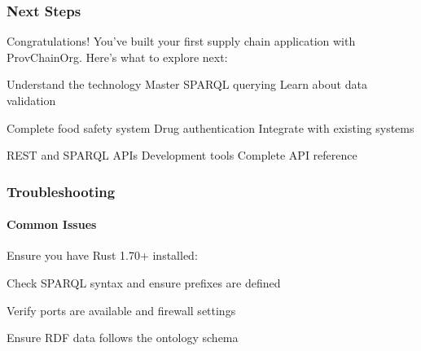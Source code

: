 \documentclass[letterpaper,10pt,english]{sphinxmanual}
\begin{document}
\subsubsection{Next Steps}
\label{\detokenize{tutorials/first-supply-chain:next-steps}}
\sphinxAtStartPar
Congratulations! You’ve built your first supply chain application with ProvChainOrg. Here’s what to explore next:

\sphinxAtStartPar
{}
\sphinxhyphen{} {\hyperref[\detokenize{foundational/intro-to-rdf-blockchain::doc}]{}} \sphinxhyphen{} Understand the technology
\sphinxhyphen{}  \sphinxhyphen{} Master SPARQL querying
\sphinxhyphen{}  \sphinxhyphen{} Learn about data validation

\sphinxAtStartPar
{}
\sphinxhyphen{}  \sphinxhyphen{} Complete food safety system
\sphinxhyphen{}  \sphinxhyphen{} Drug authentication
\sphinxhyphen{}  \sphinxhyphen{} Integrate with existing systems

\sphinxAtStartPar
{}
\sphinxhyphen{}  \sphinxhyphen{} REST and SPARQL APIs
\sphinxhyphen{}  \sphinxhyphen{} Development tools
\sphinxhyphen{} {\hyperref[\detokenize{api/rest-api::doc}]{}} \sphinxhyphen{} Complete API reference


\subsubsection{Troubleshooting}
\label{\detokenize{tutorials/first-supply-chain:troubleshooting}}

\paragraph{Common Issues}
\label{\detokenize{tutorials/first-supply-chain:common-issues}}\begin{description}
\sphinxAtStartPar
Ensure you have Rust 1.70+ installed: 

\sphinxAtStartPar
Check SPARQL syntax and ensure prefixes are defined

\sphinxAtStartPar
Verify ports are available and firewall settings

\sphinxAtStartPar
Ensure RDF data follows the ontology schema

\end{description}
\end{document}
